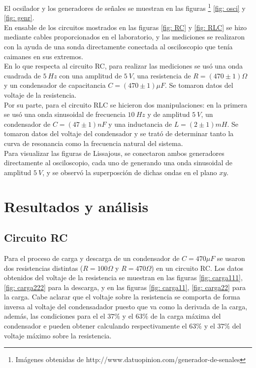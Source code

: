 \documentclass[prb,aps,twocolumn,preprintnumbers,amsmath,amssymb]{revtex4}
\begin{document}
El ocsilador y los generadores de señales se muestran en las figuras \footnote{Imágenes obtenidas de http://www.datuopinion.com/generador-de-senales} \ref{fig: osci} y \ref{fig: genr}.\\

En ensable de los circuitos mostrados en las figuras \ref{fig: RC} y \ref{fig: RLC} se hizo mediante cables proporcionados en el laboratorio, y las mediciones se realizaron con la ayuda de una sonda directamente conectada al osciloscopio que tenía caimanes en sus extremos.\\

En lo que respecta al circuito RC, para realizar las mediciones se usó una onda cuadrada de $5\ Hz$ con una amplitud de $5\ V$, una resistencia de $R = (470 \pm 1)\Omega$ y un condensador de capacitancia $C = (470 \pm 1)\mu F$. Se tomaron datos del voltaje de la resistencia.\\

Por su parte, para el circuito RLC se hicieron dos manipulaciones: en la primera se usó una onda sinusoidal de frecuencia $10\ Hz$ y de amplitud $5\ V$, un condensador de $C = (47 \pm 1)nF$ y una inductancia de $L = (2 \pm 1)mH$. Se tomaron datos del voltaje del condensador y se trató de determinar tanto la curva de resonancia como la frecuencia natural del sistema.\\

Para visualizar las figuras de Lissajous, se conectaron ambos generadores directamente al osciloscopio, cada uno de generando una onda sinusoidal de amplitud $5\ V$, y se observó la superposción de dichas ondas en el plano $xy$.

\section{Resultados y análisis}

\subsection{Circuito RC}
Para el proceso de carga y descarga de un condensador de $C = 470 \mu F$ se usaron dos resistencias distintas ($R = 100 \Omega$ y $R = 470 \Omega$) en un circuito RC. Los datos obtenidos del voltaje de la resistencia se muestran en las figuras \ref{fig: carga111}, \ref{fig: carga222} para la descarga, y en las figuras \ref{fig: carga11}, \ref{fig: carga22} para la carga. Cabe aclarar que el voltaje sobre la resistencia se comporta de forma inversa al voltaje del condensadador puesto que va como la derivada de la carga, además, las condiciones para el el $37\%$ y el $63\%$ de la carga máxima del condensador e pueden obtener calculando respectivamente el $63\%$ y el $37\%$ del voltaje máximo sobre la resistencia.
\end{document}

